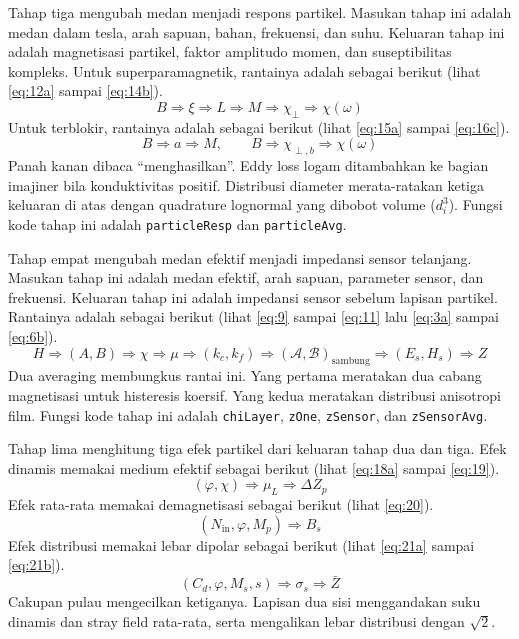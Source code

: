\documentclass[a4paper,11pt]{article}
\begin{document}
Tahap tiga mengubah medan menjadi respons partikel.
Masukan tahap ini adalah medan dalam tesla, arah sapuan, bahan, frekuensi,
dan suhu.
Keluaran tahap ini adalah magnetisasi partikel, faktor amplitudo momen,
dan suseptibilitas kompleks.
Untuk superparamagnetik, rantainya adalah sebagai berikut
(lihat \eqref{eq:12a} sampai \eqref{eq:14b}).
\begin{equation*}
B \Rightarrow \xi \Rightarrow L \Rightarrow M \Rightarrow \chi_{\perp}
\Rightarrow \chi(\omega)
\end{equation*}
Untuk terblokir, rantainya adalah sebagai berikut
(lihat \eqref{eq:15a} sampai \eqref{eq:16c}).
\begin{equation*}
B \Rightarrow a \Rightarrow M,\qquad
B \Rightarrow \chi_{\perp,b} \Rightarrow \chi(\omega)
\end{equation*}
Panah kanan dibaca ``menghasilkan''.
Eddy loss logam ditambahkan ke bagian imajiner bila konduktivitas positif.
Distribusi diameter merata-ratakan ketiga keluaran di atas
dengan quadrature lognormal yang dibobot volume ($d_{i}^{3}$).
Fungsi kode tahap ini adalah \texttt{particleResp} dan \texttt{particleAvg}.

Tahap empat mengubah medan efektif menjadi impedansi sensor telanjang.
Masukan tahap ini adalah medan efektif, arah sapuan, parameter sensor,
dan frekuensi.
Keluaran tahap ini adalah impedansi sensor sebelum lapisan partikel.
Rantainya adalah sebagai berikut
(lihat \eqref{eq:9} sampai \eqref{eq:11} lalu \eqref{eq:3a} sampai \eqref{eq:6b}).
\begin{equation*}
H \Rightarrow (A,B) \Rightarrow \chi \Rightarrow \mu
\Rightarrow (k_{c},k_{f}) \Rightarrow (\mathcal{A},\mathcal{B})_{\mathrm{sambung}}
\Rightarrow (E_{s},H_{s}) \Rightarrow Z
\end{equation*}
Dua averaging membungkus rantai ini.
Yang pertama meratakan dua cabang magnetisasi untuk histeresis koersif.
Yang kedua meratakan distribusi anisotropi film.
Fungsi kode tahap ini adalah \texttt{chiLayer}, \texttt{zOne},
\texttt{zSensor}, dan \texttt{zSensorAvg}.

Tahap lima menghitung tiga efek partikel dari keluaran tahap dua dan tiga.
Efek dinamis memakai medium efektif sebagai berikut
(lihat \eqref{eq:18a} sampai \eqref{eq:19}).
\begin{equation*}
(\varphi,\chi) \Rightarrow \mu_{L} \Rightarrow \Delta Z_{p}
\end{equation*}
Efek rata-rata memakai demagnetisasi sebagai berikut
(lihat \eqref{eq:20}).
\begin{equation*}
(N_{\mathrm{in}},\varphi,M_{p}) \Rightarrow B_{s}
\end{equation*}
Efek distribusi memakai lebar dipolar sebagai berikut
(lihat \eqref{eq:21a} sampai \eqref{eq:21b}).
\begin{equation*}
(C_{d},\varphi,M_{s},s) \Rightarrow \sigma_{s} \Rightarrow \bar Z
\end{equation*}
Cakupan pulau mengecilkan ketiganya. Lapisan dua sisi menggandakan
suku dinamis dan stray field rata-rata, serta mengalikan lebar distribusi
dengan $\sqrt{2}$.
\end{document}
